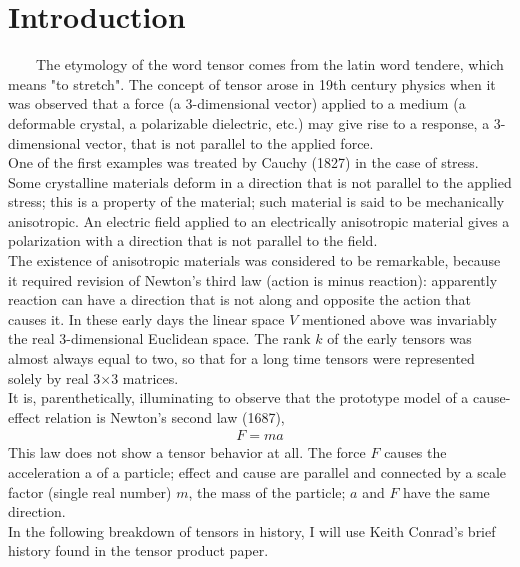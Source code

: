 \documentclass[12pt,a4paper]{article}
\begin{document}
\section*{Introduction}
\ \ \ \ 
The etymology of the word tensor comes from the latin word tendere, which means "to stretch". The concept of tensor arose in 19th century physics when it was observed that a force (a 3-dimensional vector) applied to a medium (a deformable crystal, a polarizable dielectric, etc.) may give rise to a response, a 3-dimensional vector, that is not parallel to the applied force. \\ 
One of the first examples was treated by Cauchy (1827) in the case of stress. Some crystalline materials deform in a direction that is not parallel to the applied stress; this is a property of the material; such material is said to be mechanically anisotropic. An electric field applied to an electrically anisotropic material gives a polarization with a direction that is not parallel to the field. 
\\The existence of anisotropic materials was considered to be remarkable, because it required revision of Newton's third law (action is minus reaction): apparently reaction can have a direction that is not along and opposite the action that causes it. In these early days the linear space $V$ mentioned above was invariably the real 3-dimensional Euclidean space. The rank $k$ of the early tensors was almost always equal to two, so that for a long time tensors were represented solely by real 3$\times$3 matrices.
\\It is, parenthetically, illuminating to observe that the prototype model of a cause-effect relation is Newton's second law (1687),
\begin{align*}
F = ma
\end{align*}
This law does not show a tensor behavior at all. The force $F$ causes the acceleration a of a particle; effect and cause are parallel and connected by a scale factor (single real number) $m$, the mass of the particle; $a$ and $F$ have the same direction.\\ In the following breakdown of tensors in history, I will use Keith Conrad's brief history found in the tensor product paper.
\end{document}
